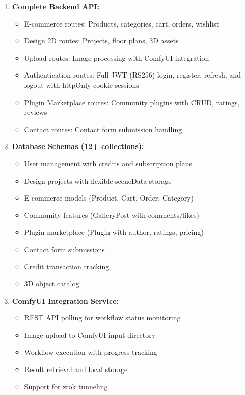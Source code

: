 \begin{enumerate}
    \item \textbf{Complete Backend API:}
    \begin{itemize}
        \item E-commerce routes: Products, categories, cart, orders, wishlist
        \item Design 2D routes: Projects, floor plans, 3D assets
        \item Upload routes: Image processing with ComfyUI integration
        \item Authentication routes: Full JWT (RS256) login, register, refresh, and logout with httpOnly cookie sessions
        \item Plugin Marketplace routes: Community plugins with CRUD, ratings, reviews
        \item Contact routes: Contact form submission handling
    \end{itemize}
    
    \item \textbf{Database Schemas (12+ collections):}
    \begin{itemize}
        \item User management with credits and subscription plans
        \item Design projects with flexible sceneData storage
        \item E-commerce models (Product, Cart, Order, Category)
        \item Community features (GalleryPost with comments/likes)
        \item Plugin marketplace (Plugin with author, ratings, pricing)
        \item Contact form submissions
        \item Credit transaction tracking
        \item 3D object catalog
    \end{itemize}
    
    \item \textbf{ComfyUI Integration Service:}
    \begin{itemize}
        \item REST API polling for workflow status monitoring
        \item Image upload to ComfyUI input directory
        \item Workflow execution with progress tracking
        \item Result retrieval and local storage
        \item Support for zrok tunneling
    \end{itemize}
    

\end{enumerate}
